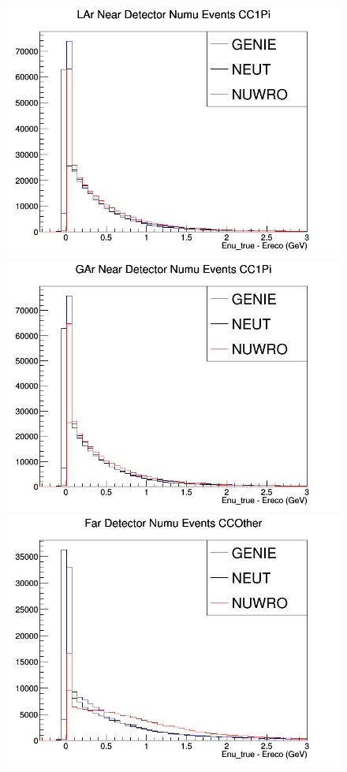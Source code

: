 \begin{figure}[h]
\endminipage
{}
\includegraphics[width=\linewidth]{Ereco_Etrue/numu_LAr_CC1Pi.png}
\endminipage
{}
\includegraphics[width=\linewidth]{Ereco_Etrue/numu_GAr_CC1Pi.png}
\endminipage
\newline
{}
\includegraphics[width=\linewidth]{Ereco_Etrue/numu_FD_CCOther.png}

\end{figure}

